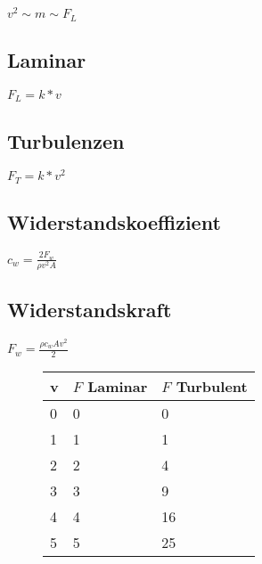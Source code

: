 \begin{multicols}{2}
	

\(v^2 \sim m \sim F_L\)

\subsection{Laminar}

\(F_L = k * v\)

\subsection{Turbulenzen}

\(F_T = k * v^2 \)

\subsection{\label{sec:widerst} Widerstandskoeffizient}

\( c_w = \frac{2F_w}{\rho v^2 A} \)

\subsection{Widerstandskraft}

\(F_w = \frac{\rho c_w A v^2}{2} \)

\begin{figure}
	\centering
	\begin{tabular}{|l|l|l|}
		\hline
		\textbf{v} & \textbf{\(F\) Laminar} & \textbf{\(F\) Turbulent} \\
		\hline
		0 & 0 & 0\\ \hline
		1 & 1 & 1\\ \hline
		2 & 2 & 4\\ \hline
		3 & 3 & 9\\ \hline
		4 & 4 & 16\\ \hline
		5 & 5 & 25\\ \hline
		
	\end{tabular}
	\caption{\label{fig:tablegraph}}
\end{figure}

\end{multicols}
